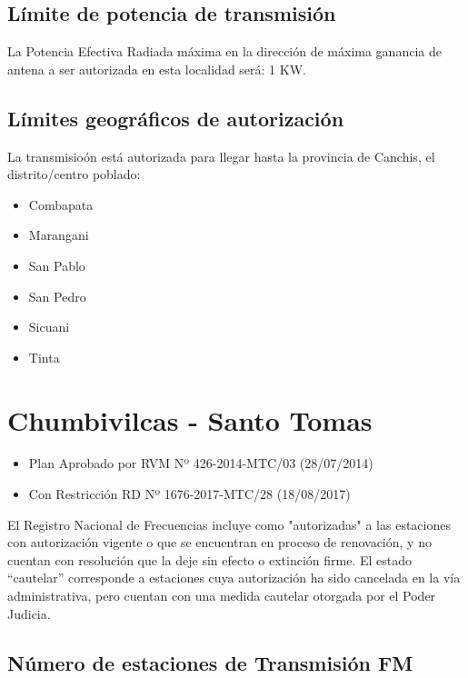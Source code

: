 \documentclass[11pt]{article}
\begin{document}
\subsection{Límite de potencia de transmisión}

La Potencia Efectiva Radiada máxima en la dirección de máxima ganancia de antena a ser autorizada en esta localidad será: 1 KW.

\subsection{Límites geográficos de autorización}

La transmisioón está autorizada para llegar hasta la provincia de Canchis, el distrito/centro poblado:

\begin{itemize}
	\item Combapata
	\item Marangani
	\item San Pablo
	\item San Pedro
	\item Sicuani
	\item Tinta
\end{itemize}



\section{Chumbivilcas - Santo Tomas}

\begin{itemize}
	\item Plan Aprobado por RVM Nº 426-2014-MTC/03 (28/07/2014)
	\item Con Restricción RD Nº 1676-2017-MTC/28 (18/08/2017)
\end{itemize}

El Registro Nacional de Frecuencias incluye como "autorizadas" a las estaciones con autorización vigente o que se encuentran en proceso de renovación, y no cuentan con resolución que la deje sin efecto o extinción firme. El estado “cautelar” corresponde a estaciones cuya autorización ha sido cancelada en la vía administrativa, pero cuentan con una medida cautelar otorgada por el Poder Judicia.

\subsection{Número de estaciones de Transmisión FM}
\end{document}
